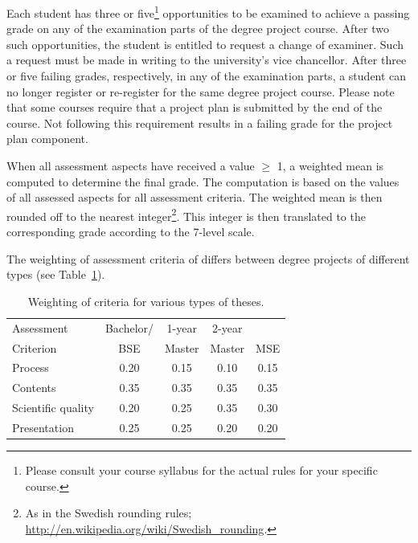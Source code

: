 \documentclass[a4paper,12pt]{book}
\begin{document}
Each student has three or five\footnote{Please consult your course syllabus for the actual
rules for your specific course.} opportunities to be examined to achieve a passing grade
on any of the examination parts of the degree project course. After two such
opportunities, the student is entitled to request a change of examiner.
Such a request must be made in writing to the university's vice chancellor.
After three or five failing grades, respectively, in any of the examination parts,
a student can no longer register or re-register for the same degree project course.
Please note that some courses require that a project plan is submitted by the end of
the course. Not following this requirement results in a failing grade for the project
plan component.

When all assessment aspects have received a value $\geq$ 1, a weighted mean is computed
to determine the final grade. The computation is based on the
values of all assessed aspects for all assessment criteria.
The weighted mean is then rounded off to the nearest integer\footnote{As in the
Swedish rounding rules; \url{http://en.wikipedia.org/wiki/Swedish_rounding}.}.
This integer is then translated to the corresponding grade according to the 7-level scale.

The weighting of assessment criteria of differs between
degree projects of different types (see Table~\ref{tab:viktning}).
%
\begin{table}
\centering
\caption{Weighting of criteria for various types of theses.}
\label{tab:viktning}
\begin{tabular}{|l|c|c|c|c|}
\hline
Assessment                  & Bachelor/ & 1-year  & 2-year &        \\
Criterion                   & BSE       & Master  & Master & MSE    \\\hline
Process                     & 0.20      & 0.15    & 0.10   & 0.15   \\\hline
Contents                    & 0.35      & 0.35    & 0.35   & 0.35   \\\hline
Scientific quality          & 0.20      & 0.25    & 0.35   & 0.30   \\\hline
Presentation                & 0.25      & 0.25    & 0.20   & 0.20   \\\hline
\end{tabular}
\end{table}
%
\end{document}
